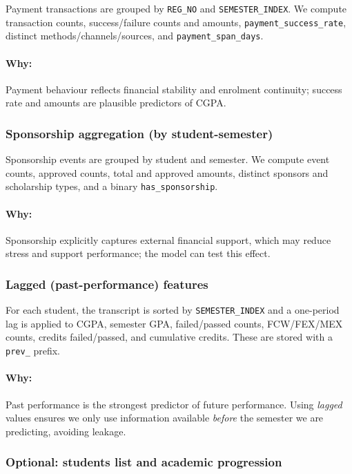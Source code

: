 \documentclass[12pt,a4paper]{article}
\begin{document}
Payment transactions are grouped by \texttt{REG\_NO} and \texttt{SEMESTER\_INDEX}. We compute transaction counts, success/failure counts and amounts, \texttt{payment\_success\_rate}, distinct methods/channels/sources, and \texttt{payment\_span\_days}.

\paragraph{Why:} Payment behaviour reflects financial stability and enrolment continuity; success rate and amounts are plausible predictors of CGPA.

\subsubsection{Sponsorship aggregation (by student-semester)}

Sponsorship events are grouped by student and semester. We compute event counts, approved counts, total and approved amounts, distinct sponsors and scholarship types, and a binary \texttt{has\_sponsorship}.

\paragraph{Why:} Sponsorship explicitly captures external financial support, which may reduce stress and support performance; the model can test this effect.

\subsubsection{Lagged (past-performance) features}

For each student, the transcript is sorted by \texttt{SEMESTER\_INDEX} and a one-period lag is applied to CGPA, semester GPA, failed/passed counts, FCW/FEX/MEX counts, credits failed/passed, and cumulative credits. These are stored with a \texttt{prev\_} prefix.

\paragraph{Why:} Past performance is the strongest predictor of future performance. Using \emph{lagged} values ensures we only use information available \emph{before} the semester we are predicting, avoiding leakage.

\subsubsection{Optional: students list and academic progression}
\end{document}
